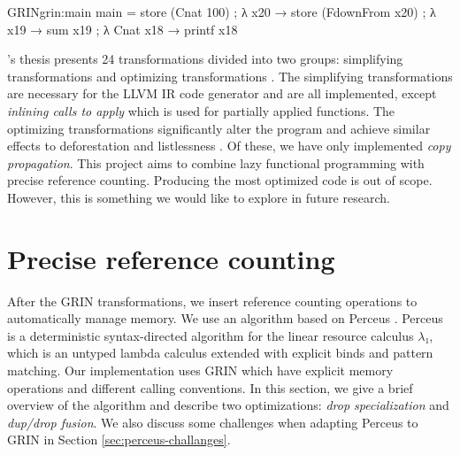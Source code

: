 \documentclass[9pt, twocolumn]{article}
\begin{document}
\begin{typewriter}[left]{GRIN}{grin:main}
main =
  store (Cnat 100) ; λ x20 →
  store (FdownFrom x20) ; λ x19 →
  sum x19 ; λ Cnat x18 →
  printf x18
\end{typewriter}

\citeauthor{boquist1999}'s thesis presents 24 transformations divided into two groups: simplifying transformations and optimizing 
transformations \citep{boquist1999}. 
The simplifying transformations are necessary for the LLVM IR code generator and are all implemented, except \emph{inlining calls to apply}
which is used for partially applied functions. 
The optimizing transformations significantly alter the program and achieve similar effects to deforestation \citep{wadler1988} and listlessness \citep{wadler1984}.
Of these, we have only implemented \emph{copy propagation}.
This project aims to combine lazy functional programming with precise reference counting. 
Producing the most optimized code is out of scope. 
However, this is something we would like to explore in future research.

\section{Precise reference counting}
After the GRIN transformations, we insert reference counting operations to automatically manage memory.
We use an algorithm based on Perceus \citep{reinking2021}. 
Perceus is a deterministic syntax-directed algorithm for the linear resource calculus $λ₁$, which is an untyped lambda calculus extended with explicit binds and pattern matching.
Our implementation uses GRIN which have explicit memory operations and different calling conventions.
In this section, we give a brief overview of the algorithm and describe two optimizations: \emph{drop specialization} and \emph{dup/drop fusion}.
We also discuss some challenges when adapting Perceus to GRIN in Section \ref{sec:perceus-challanges}. 
\end{document}
